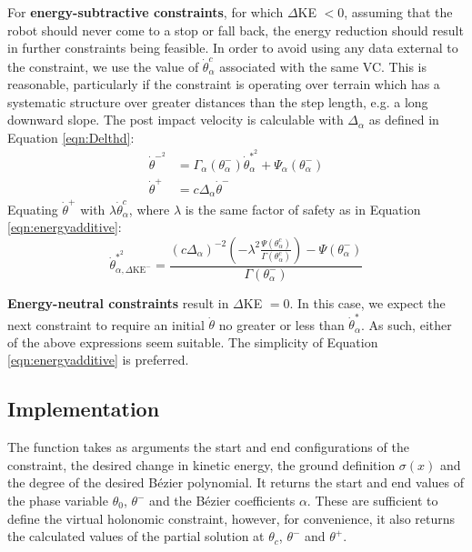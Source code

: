 For \textbf{energy-subtractive constraints}, for which $\Delta$KE $<0$, assuming that the robot should never come to a stop or fall back, the energy reduction should result in further constraints being feasible. In order to avoid using any data external to the constraint, we use the value of $\dot{\theta}_\alpha^c$ associated with the same VC. This is reasonable, particularly if the constraint is operating over terrain which has a systematic structure over greater distances than the step length, e.g. a long downward slope. The post impact velocity is calculable with $\Delta_\alpha$ as defined in Equation \ref{eqn:Delthd}:
\begin{subequations}
	\begin{align}
	\dot{\theta}^{-^2} &= \Gamma_\alpha(\theta_\alpha^-)\dot{\theta}_\alpha^{*^2} + \Psi_\alpha(\theta_\alpha^-) \\
	\dot{\theta}^+ &= c\Delta_\alpha\dot{\theta}^-
	\end{align}
\end{subequations}
Equating $\dot{\theta}^+$ with $\lambda\dot{\theta}_\alpha^c$, where $\lambda$ is the same factor of safety as in Equation \ref{eqn:energyadditive}:
\begin{equation}
	\dot{\theta}_{\alpha,\Delta\mathrm{KE}^-}^{*^2} = \frac{(c\Delta_\alpha)^{-2}\left(-\lambda^2\frac{ \Psi(\theta_\alpha^c)}{ \Gamma(\theta_\alpha^c)}\right) - \Psi(\theta_\alpha^-)} {\Gamma(\theta_\alpha^-)}
\end{equation}

\textbf{Energy-neutral constraints} result in $\Delta$KE $=0$. In this case, we expect the next constraint to require an initial $\dot{\theta}$ no greater or less than $\dot{\theta}_\alpha^*$. As such, either of the above expressions seem suitable. The simplicity of Equation \ref{eqn:energyadditive} is preferred.

\subsection{Implementation}
The  function takes as arguments the start and end configurations of the constraint, the desired change in kinetic energy, the ground definition $\sigma(x)$ and the degree of the desired Bézier polynomial. It returns the start and end values of the phase variable $\theta_0$, $\theta^-$ and the Bézier coefficients $\alpha$. These are sufficient to define the virtual holonomic constraint, however, for convenience, it also returns the calculated values of the partial solution at $\theta_c$, $\theta^-$ and $\theta^+$.

